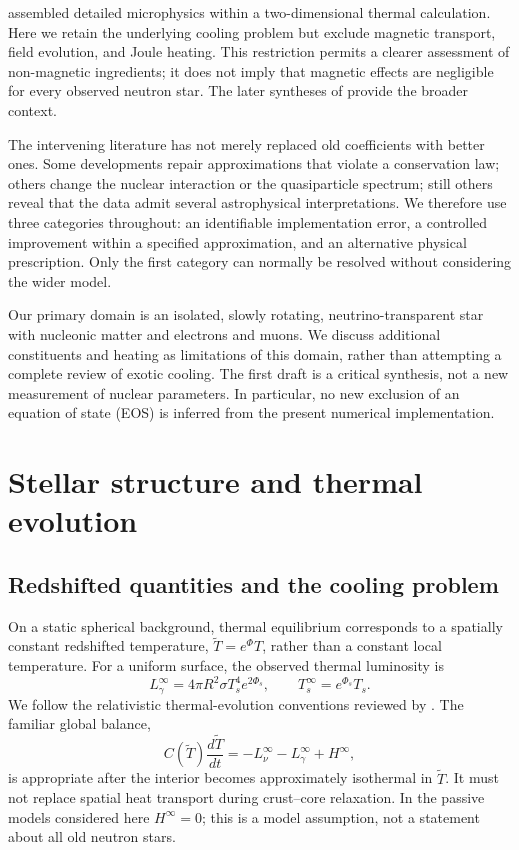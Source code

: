 \documentclass{aa}
\newcommand{\Tinf}{\widetilde T}
\begin{document}
\citet{Aguilera2008} assembled detailed microphysics within a two-dimensional thermal calculation. Here we retain the underlying cooling problem but exclude magnetic transport, field evolution, and Joule heating. This restriction permits a clearer assessment of non-magnetic ingredients; it does not imply that magnetic effects are negligible for every observed neutron star. The later syntheses of \citet{YakovlevPethick2004,Potekhin2015,Schmitt2018} provide the broader context.

The intervening literature has not merely replaced old coefficients with better ones. Some developments repair approximations that violate a conservation law; others change the nuclear interaction or the quasiparticle spectrum; still others reveal that the data admit several astrophysical interpretations. We therefore use three categories throughout: an identifiable implementation error, a controlled improvement within a specified approximation, and an alternative physical prescription. Only the first category can normally be resolved without considering the wider model.

Our primary domain is an isolated, slowly rotating, neutrino-transparent star with nucleonic matter and electrons and muons. We discuss additional constituents and heating as limitations of this domain, rather than attempting a complete review of exotic cooling. The first draft is a critical synthesis, not a new measurement of nuclear parameters. In particular, no new exclusion of an equation of state (EOS) is inferred from the present numerical implementation.

\section{Stellar structure and thermal evolution}
\subsection{Redshifted quantities and the cooling problem}
On a static spherical background, thermal equilibrium corresponds to a spatially constant redshifted temperature, $\Tinf=e^\Phi T$, rather than a constant local temperature. For a uniform surface, the observed thermal luminosity is
\begin{equation}
 L_\gamma^\infty=4\pi R^2\sigma T_s^4 e^{2\Phi_s},
 \qquad T_s^\infty=e^{\Phi_s}T_s.
\end{equation}
We follow the relativistic thermal-evolution conventions reviewed by \citet{YakovlevPethick2004}. The familiar global balance,
\begin{equation}
 C(\Tinf)\frac{d\Tinf}{dt}=-L_\nu^\infty-L_\gamma^\infty+H^\infty,
\end{equation}
is appropriate after the interior becomes approximately isothermal in $\Tinf$. It must not replace spatial heat transport during crust--core relaxation. In the passive models considered here $H^\infty=0$; this is a model assumption, not a statement about all old neutron stars.
\end{document}
